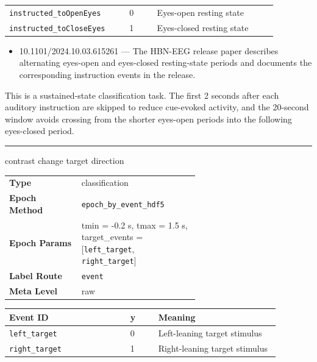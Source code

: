 {\begin{tcolorbox}
\begin{tabular}{@{}p{0.3911\linewidth}p{0.0978\linewidth}p{0.3911\linewidth}@{}}
\midrule
\texttt{instructed\_toOpenEyes} & 0 & Eyes-open resting state \\
\texttt{instructed\_toCloseEyes} & 1 & Eyes-closed resting state \\
\bottomrule
\end{tabular}
\endgroup
\par{}\par
\begin{itemize}[leftmargin=1.3em,noitemsep,topsep=1pt]
\item[\scriptsize$\cdot$] {\scriptsize 10.1101/2024.10.03.615261 --- The HBN-EEG release paper describes alternating eyes-open and eyes-closed resting-state periods and documents the corresponding instruction events in the release.}
\end{itemize}
\par{} {\footnotesize This is a sustained-state classification task. The first 2 seconds after each auditory instruction are skipped to reduce cue-evoked activity, and the 20-second window avoids crossing from the shorter eyes-open periods into the following eyes-closed period.}
\noindent\rule{\linewidth}{0.7pt}\par\nopagebreak
{} {\footnotesize contrast change target direction}\par\smallskip
{\footnotesize\begin{tabular}{@{}lp{0.62\linewidth}@{}}
\textbf{Type} & classification \\
\textbf{Epoch Method} & \texttt{epoch\_by\_event\_hdf5} \\
\textbf{Epoch Params} & tmin = -0.2 s, tmax = 1.5 s, target\_events = [\texttt{left\_target}, \texttt{right\_target}] \\
\textbf{Label Route} & \texttt{event} \\
\textbf{Meta Level} & raw \\
\end{tabular}}
\par{}\par\smallskip
\begingroup\footnotesize
\begin{tabular}{@{}p{0.3911\linewidth}p{0.0978\linewidth}p{0.3911\linewidth}@{}}
\toprule
\textbf{Event ID} & \textbf{y} & \textbf{Meaning} \\
\midrule
\texttt{left\_target} & 0 & Left-leaning target stimulus \\
\texttt{right\_target} & 1 & Right-leaning target stimulus \\

\end{tabular}
\end{tcolorbox}}
